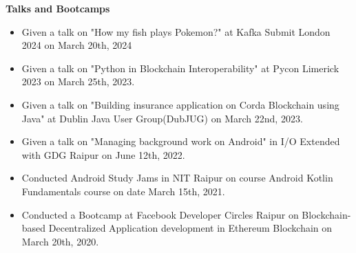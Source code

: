 \documentclass{article}
\begin{document}
\noindent \large \textbf{\textcolor{NavyBlue}{Talks and Bootcamps}}
\begin{itemize}[noitemsep,nolistsep,leftmargin=*]
    \item { \normalsize Given a talk on "How my fish plays Pokemon?" at Kafka Submit London 2024 on March 20th, 2024}
    \item { \normalsize Given a talk on "Python in Blockchain Interoperability" at Pycon Limerick 2023 on March 25th, 2023.}
    \item { \normalsize Given a talk on "Building insurance application on Corda Blockchain using Java" at Dublin Java User Group(DubJUG) on March 22nd, 2023.}
    \item { \normalsize Given a talk on "Managing background work on Android" in I/O Extended with GDG Raipur on June 12th, 2022.  }
    \item { \normalsize Conducted Android Study Jams in NIT Raipur on course Android Kotlin Fundamentals course on date March 15th, 2021. }
    \item { \normalsize Conducted a Bootcamp at Facebook Developer Circles Raipur on Blockchain-based Decentralized Application development in Ethereum Blockchain on March 20th, 2020. }
\end{itemize}
\vspace{3pt}
\end{document}
